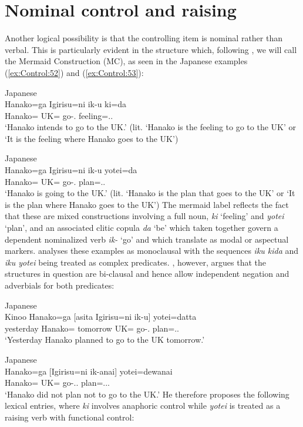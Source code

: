 \documentclass[output=paper,hidelinks]{langscibook}
\begin{document}
\section{Nominal control and raising}
\label{sec:Control:8}

Another logical possibility is that the controlling item is nominal rather than verbal. This is particularly evident in the structure which, following \citet{Tsunoda2020}, we will call the Mermaid Construction (MC), as seen in the Japanese examples (\ref{ex:Control:52}) and (\ref{ex:Control:53}):

\ea\label{ex:Control:52}Japanese\\
\gll Hanako=ga  Igirisu=ni ik-u    ki=da\\
{Hanako=\NOM} {UK=\DAT} {go-\NPST.} {feeling=\COP.\NPST.\DECL}\\
\glt`Hanako intends to go to the UK.' (lit. `Hanako is the feeling to go to the UK' or `It is the feeling where Hanako goes to the UK')
\z

\ea\label{ex:Control:53}Japanese\\
\gll Hanako=ga  Igirisu=ni ik-u    yotei=da\\
{Hanako=\NOM} {UK=\DAT} {go-\NPST.} {plan=\COP.\NPST.\DECL}\\
\glt`Hanako is going to the UK.' (lit. `Hanako is the plan that goes to the UK' or `It is the plan where Hanako goes to the UK')
\z
The mermaid label reflects the fact that these are mixed constructions involving
a full noun, \emph{ki} `feeling' and \emph{yotei} `plan', and an associated clitic copula \emph{da} `be' which taken together govern a dependent nominalized verb \emph{ik-} `go' and which translate as modal or aspectual markers. \citet{Tsunoda2020} analyses these examples as monoclausal with the sequences \emph{iku kida} and \emph{iku yotei} being treated as complex predicates. \citet{Taguchi2022}, however, argues that the structures in question are bi-clausal and hence allow independent negation and adverbials for both predicates:

\newpage
\ea\label{ex:Control:54}Japanese\\
\gll Kinoo Hanako=ga  [asita   Igirisu=ni ik-u]    yotei=datta \\
yesterday {Hanako=\NOM} tomorrow {UK=\DAT} {go-\NPST.} {plan=\COP.\PST.\DECL} \\
\glt   `Yesterday Hanako planned to go to the UK tomorrow.'
\z
            
\ea\label{ex:Control:55}Japanese\\
\gll Hanako=ga  [Igirisu=ni ik-anai]     yotei=dewanai\\
 {Hanako=\NOM} {UK=\DAT} {go-\NEG.\NPST.} {plan=\NEG.\COP.\PST.\DECL}\\
\glt   `Hanako did not plan not to go to the UK.'
\z
He therefore proposes the following lexical entries, where \emph{ki} involves anaphoric control while \emph{yotei} is treated as a raising verb with functional control:
\end{document}
